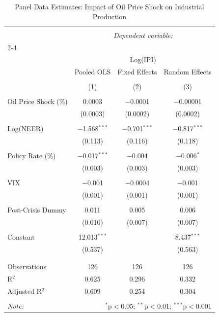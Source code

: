 
\begin{table}[!htbp] \centering 
  \caption{Panel Data Estimates: Impact of Oil Price Shock on Industrial Production} 
  \label{} 
\begin{tabular}{@{\extracolsep{5pt}}lccc} 
\\[-1.8ex]\hline 
\hline \\[-1.8ex] 
 & \multicolumn{3}{c}{\textit{Dependent variable:}} \\ 
\cline{2-4} 
\\[-1.8ex] & \multicolumn{3}{c}{Log(IPI)} \\ 
 & Pooled OLS & Fixed Effects & Random Effects \\ 
\\[-1.8ex] & (1) & (2) & (3)\\ 
\hline \\[-1.8ex] 
 Oil Price Shock (\%) & 0.0003 & $-$0.0001 & $-$0.00001 \\ 
  & (0.0003) & (0.0002) & (0.0002) \\ 
  & & & \\ 
 Log(NEER) & $-$1.568$^{***}$ & $-$0.701$^{***}$ & $-$0.817$^{***}$ \\ 
  & (0.113) & (0.116) & (0.118) \\ 
  & & & \\ 
 Policy Rate (\%) & $-$0.017$^{***}$ & $-$0.004 & $-$0.006$^{*}$ \\ 
  & (0.003) & (0.003) & (0.003) \\ 
  & & & \\ 
 VIX & $-$0.001 & $-$0.0004 & $-$0.001 \\ 
  & (0.001) & (0.001) & (0.001) \\ 
  & & & \\ 
 Post-Crisis Dummy & 0.011 & 0.005 & 0.006 \\ 
  & (0.010) & (0.007) & (0.007) \\ 
  & & & \\ 
 Constant & 12.013$^{***}$ &  & 8.437$^{***}$ \\ 
  & (0.537) &  & (0.563) \\ 
  & & & \\ 
\hline \\[-1.8ex] 
Observations & 126 & 126 & 126 \\ 
R$^{2}$ & 0.625 & 0.296 & 0.332 \\ 
Adjusted R$^{2}$ & 0.609 & 0.254 & 0.304 \\ 
\hline 
\hline \\[-1.8ex] 
\textit{Note:}  & \multicolumn{3}{r}{$^{*}$p$<$0.05; $^{**}$p$<$0.01; $^{***}$p$<$0.001} \\ 
\end{tabular} 
\end{table} 
